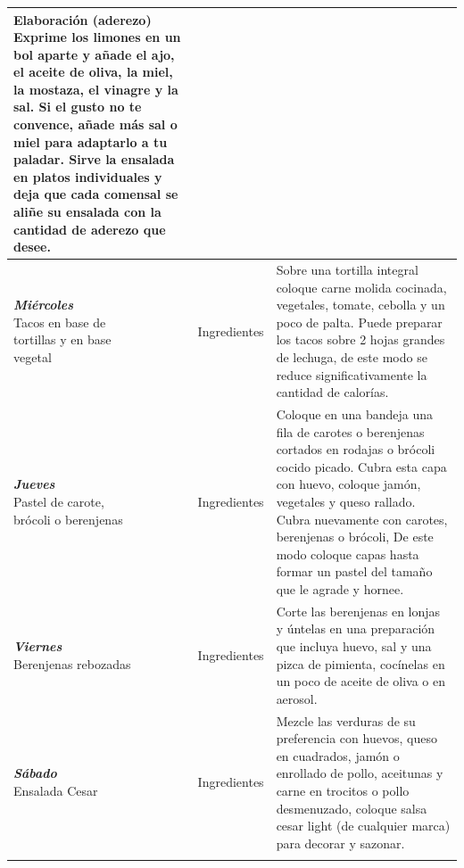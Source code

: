 \documentclass[menu.tex]{subfiles}
\begin{document}
\begin{tabular} {p{3.5cm} p{4cm} p{9cm}}
    Elaboración (aderezo)
    Exprime los limones en un bol aparte y añade el ajo, el aceite de oliva, la miel, la mostaza, el vinagre y la sal.
    Si el gusto no te convence, añade más sal o miel para adaptarlo a tu paladar.
    Sirve la ensalada en platos individuales y deja que cada comensal se aliñe su ensalada con la cantidad de aderezo que desee.\\ \hline
            
            \pbox{20cm}{\textbf{\textit{Miércoles}} \\ Tacos en base de \\ tortillas y en base \\ vegetal} & Ingredientes & Sobre una tortilla integral coloque carne molida cocinada, vegetales, tomate, cebolla y un poco de palta. Puede preparar los tacos sobre 2 hojas grandes de lechuga, de este modo se reduce significativamente la cantidad de calorías. \\ \hline
            
            \pbox{20cm}{\textbf{\textit{Jueves}} \\ Pastel de carote, \\ brócoli o berenjenas} & Ingredientes & Coloque en una bandeja una fila de carotes o berenjenas cortados en rodajas o brócoli cocido picado. Cubra esta capa con huevo, coloque jamón, vegetales y queso rallado. Cubra nuevamente con carotes, berenjenas o brócoli, De este modo coloque capas hasta formar un pastel del tamaño que le agrade y hornee. \\ \hline
            
            \pbox{20cm}{\textbf{\textit{Viernes}} \\ Berenjenas rebozadas} & Ingredientes & Corte las berenjenas en lonjas y úntelas en una preparación que incluya huevo, sal y una pizca de pimienta, cocínelas en un poco de aceite de oliva o en aerosol. \\ \hline
            
            \pbox{20cm}{\textbf{\textit{Sábado}} \\ Ensalada Cesar} & Ingredientes & Mezcle las verduras de su preferencia con huevos, queso en cuadrados, jamón o enrollado de pollo, aceitunas y carne en trocitos o pollo desmenuzado, coloque salsa cesar light (de cualquier marca) para decorar y sazonar. \\ \hline

            \newpage        
    \end{tabular}
    
\end{document}
